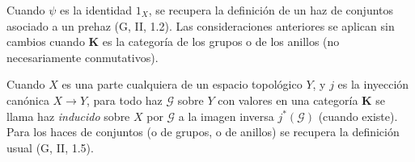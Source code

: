 \begin{env}[3.7.1]
Cuando $\psi$ es la identidad $1_X$, se recupera la definición de un haz de
conjuntos asociado a un prehaz (G, II, 1.2). Las consideraciones anteriores se
aplican sin cambios cuando $\boldsymbol{K}$ es la categoría de los grupos o
de los anillos (no necesariamente conmutativos).

Cuando $X$ es una parte cualquiera de un espacio topológico $Y$, y $j$ es la
inyección canónica $X\to Y$, para todo haz $\mathcal{G}$ sobre $Y$ con valores
en una categoría $\boldsymbol{K}$ se llama haz \emph{inducido} sobre $X$ por
$\mathcal{G}$ a la imagen inversa $j^*(\mathcal{G})$ (cuando existe). Para los
haces de conjuntos (o de grupos, o de anillos) se recupera la definición
usual (G, II, 1.5).
\end{env}
